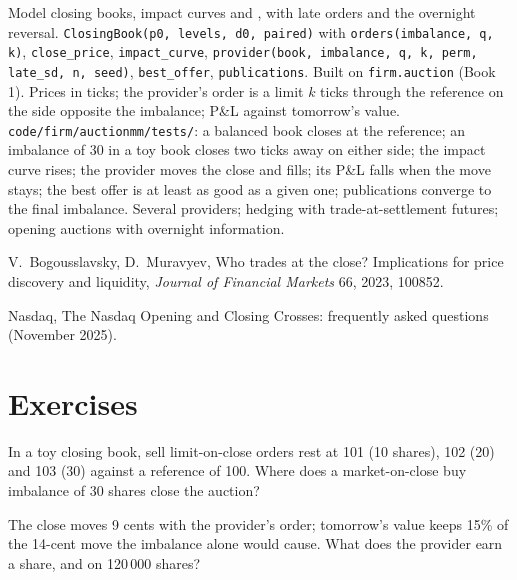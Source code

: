 \begin{build}
 Model closing books, impact curves and , with late orders and the overnight reversal.
 \texttt{ClosingBook(p0, levels, d0, paired)} with \texttt{orders(imbalance, q, k)}, \texttt{close\_price}, \texttt{impact\_curve},
\texttt{provider(book, imbalance, q, k, perm, late\_sd, n, seed)}, \texttt{best\_offer}, \texttt{publications}. Built on \texttt{firm.auction}
(Book 1).
 Prices in ticks; the provider's order is a limit $k$ ticks through the reference on the side opposite the imbalance; P\&L against
tomorrow's value.
 \texttt{code/firm/auctionmm/tests/}: a balanced book closes at the reference; an imbalance of 30 in a toy book closes two
ticks away on either side; the impact curve rises; the provider moves the close and fills; its P\&L falls when the move stays; the best offer is at
least as good as a given one; publications converge to the final imbalance.
 Several providers; hedging with trade-at-settlement futures; opening auctions with overnight information.
\end{build}

\begin{omsources}
\item V.~Bogousslavsky, D.~Muravyev, Who trades at the close? Implications for price discovery and liquidity, \emph{Journal of Financial
Markets} 66, 2023, 100852.
\item Nasdaq, The Nasdaq Opening and Closing Crosses: frequently asked questions (November 2025).
\end{omsources}

\section{Exercises}

\begin{exercise}[$\star$]\label{exo:hf:auctions-and-the-close:1}
In a toy closing book, sell limit-on-close orders rest at 101 (10 shares), 102 (20) and 103 (30) against a reference of 100. Where does a market-on-close
buy imbalance of 30 shares close the auction?
\end{exercise}

\begin{exercise}[$\star$]\label{exo:hf:auctions-and-the-close:2}
The close moves 9 cents with the provider's order; tomorrow's value keeps 15\% of the 14-cent move the imbalance alone would cause. What does the
provider earn a share, and on 120\,000 shares?
\end{exercise}

